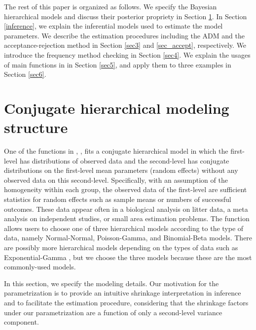 \documentclass[article]{jss}
\begin{document}
The rest of this paper is organized as follows. We specify the Bayesian hierarchical models and discuss their posterior propriety in Section \ref{sec2}. In Section \ref{inference}, we explain the inferential models used to estimate the model parameters. We describe the estimation procedures including the ADM and the acceptance-rejection method in Section  \ref{sec3} and \ref{sec_accept}, respectively. We introduce the frequency method checking in Section \ref{sec4}.  We explain the usages of main functions in  in Section \ref{sec5}, and apply them to three examples in Section \ref{sec6}.



\section[Hierarchical Structure]{Conjugate hierarchical modeling structure} \label{sec2}

One of the functions in , , fits a conjugate hierarchical model in which the first-level has distributions of observed data and the second-level has conjugate distributions on the first-level mean parameters (random effects) without any observed data on this second-level. Specifically, with an assumption of the homogeneity within each group, the observed data of the first-level are sufficient statistics  for random effects such as sample means or numbers of successful outcomes. These data appear often in a biological analysis on litter data, a meta analysis on independent studies, or small area estimation problems. The function   allows users to choose one of three hierarchical models according to the type of data, namely Normal-Normal, Poisson-Gamma, and Binomial-Beta models. There are possibly more hierarchical models depending on the types of data such as Exponential-Gamma \citep{tang2002fitting}, but we choose the three models because these are the most commonly-used models.

In this section, we specify the modeling details. Our motivation for the parametrization is to provide an intuitive shrinkage interpretation in inference and to facilitate the estimation procedure, considering that the shrinkage factors under our parametrization are a function of only a second-level variance component.
 
\end{document}
